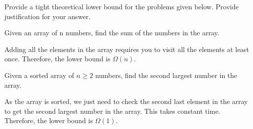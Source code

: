 \begin{prob}
    Provide a tight theoretical lower bound for the problems given below. Provide justification for your answer.

    \begin{subprobset}

        \begin{subprob}
            Given an array of n numbers, find the sum of the numbers in the array.

            \vspace{5em}

            \begin{soln}
                Adding all the elements in the array requires you to visit all the elements at least once. Therefore, the lower bound is $\Omega(n)$.
             \end{soln}

        \end{subprob}

        \begin{subprob}
            Given a sorted array of $n \geq 2$ numbers, find the second largest number in the array.

            \vspace{5em}

            \begin{soln}
                As the array is sorted, we just need to check the second last element in the array to get the second largest number in the array. This takes constant time. Therefore, the lower bound is $\Omega(1)$.
            \end{soln}

        \end{subprob}

    \end{subprobset}

\end{prob}
